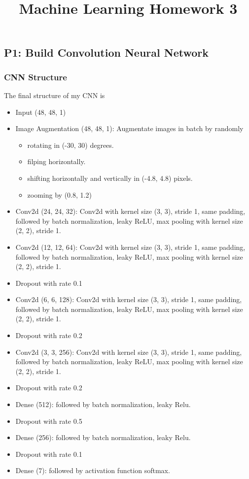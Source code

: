 \documentclass[fleqn,a4paper,12pt]{article}
\title{Machine Learning Homework 3}
\date{}
\begin{document}
\maketitle
\thispagestyle{fancy}

\subsection*{P1: Build Convolution Neural Network}

\subsubsection*{CNN Structure}

The final structure of my CNN is

\begin{itemize}
\item
  Input (48, 48, 1)
\item
  Image Augmentation (48, 48, 1): Augmentate images in batch by randomly
  \begin{itemize}
  \item rotating in (-30, 30) degrees.
  \item filping horizontally.
  \item shifting horizontally and vertically in (-4.8, 4.8) pixels.
  \item zooming by (0.8, 1.2)
  \end{itemize}
\item
  Conv2d (24, 24, 32): Conv2d with kernel size (3, 3), stride 1, same padding, followed by batch normalization, leaky ReLU, max pooling with kernel size (2, 2), stride 1.
\item
  Conv2d (12, 12, 64): Conv2d with kernel size (3, 3), stride 1, same padding, followed by batch normalization, leaky ReLU, max pooling with kernel size (2, 2), stride 1.
\item
  Dropout with rate 0.1
\item
  Conv2d (6, 6, 128): Conv2d with kernel size (3, 3), stride 1, same padding, followed by batch normalization, leaky ReLU, max pooling with kernel size (2, 2), stride 1.
\item
  Dropout with rate 0.2
\item
  Conv2d (3, 3, 256): Conv2d with kernel size (3, 3), stride 1, same padding, followed by batch normalization, leaky ReLU, max pooling with kernel size (2, 2), stride 1.
\item
  Dropout with rate 0.2
\item Dense (512): followed by batch normalization, leaky Relu.
\item
  Dropout with rate 0.5
\item Dense (256): followed by batch normalization, leaky Relu.
\item
  Dropout with rate 0.1
\item
  Dense (7): followed by activation function softmax.
\end{itemize}
\end{document}
